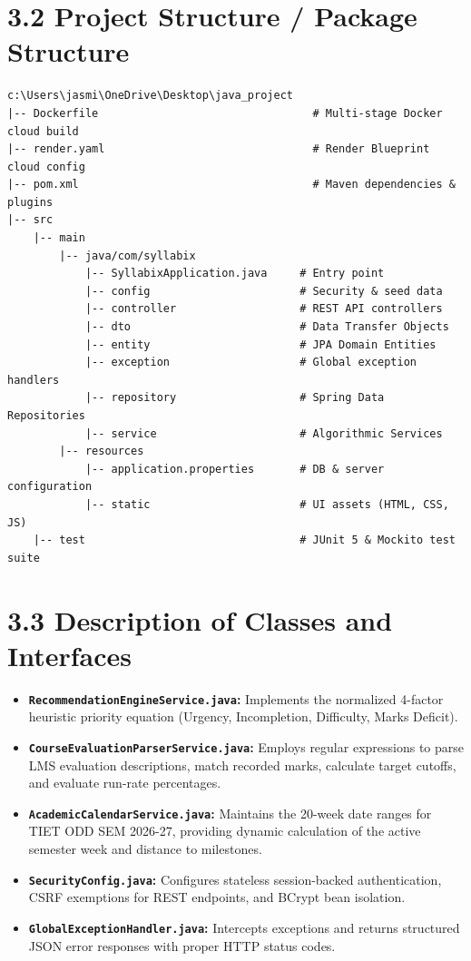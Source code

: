 \documentclass[12pt,a4paper]{report}
\begin{document}
\section{3.2 Project Structure / Package Structure}
\begin{lstlisting}[language={},numbers=none]
c:\Users\jasmi\OneDrive\Desktop\java_project
|-- Dockerfile                                 # Multi-stage Docker cloud build
|-- render.yaml                                # Render Blueprint cloud config
|-- pom.xml                                    # Maven dependencies & plugins
|-- src
    |-- main
        |-- java/com/syllabix
            |-- SyllabixApplication.java     # Entry point
            |-- config                       # Security & seed data
            |-- controller                   # REST API controllers
            |-- dto                          # Data Transfer Objects
            |-- entity                       # JPA Domain Entities
            |-- exception                    # Global exception handlers
            |-- repository                   # Spring Data Repositories
            |-- service                      # Algorithmic Services
        |-- resources
            |-- application.properties       # DB & server configuration
            |-- static                       # UI assets (HTML, CSS, JS)
    |-- test                                 # JUnit 5 & Mockito test suite
\end{lstlisting}

\section{3.3 Description of Classes and Interfaces}
\begin{itemize}
    \item \textbf{\texttt{RecommendationEngineService.java}:} Implements the normalized 4-factor heuristic priority equation (Urgency, Incompletion, Difficulty, Marks Deficit).
    \item \textbf{\texttt{CourseEvaluationParserService.java}:} Employs regular expressions to parse LMS evaluation descriptions, match recorded marks, calculate target cutoffs, and evaluate run-rate percentages.
    \item \textbf{\texttt{AcademicCalendarService.java}:} Maintains the 20-week date ranges for TIET ODD SEM 2026-27, providing dynamic calculation of the active semester week and distance to milestones.
    \item \textbf{\texttt{SecurityConfig.java}:} Configures stateless session-backed authentication, CSRF exemptions for REST endpoints, and BCrypt bean isolation.
    \item \textbf{\texttt{GlobalExceptionHandler.java}:} Intercepts exceptions and returns structured JSON error responses with proper HTTP status codes.
\end{itemize}
\end{document}
